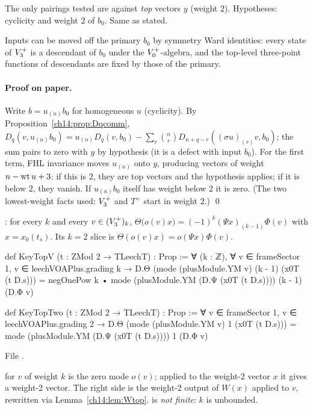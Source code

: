 \begin{dictionary}
The only pairings tested are against \emph{top} vectors $y$ (weight $2$).  Hypotheses: cyclicity and
weight $2$ of $b_0$.  Same as stated.
\end{dictionary}

\begin{physics}
Inputs can be moved off the primary $b_0$ by symmetry Ward identities: every state of $V_3^{+}$ is a
descendant of $b_0$ under the $V_0^{+}$-algebra, and the top-level three-point functions of
descendants are fixed by those of the primary.
\end{physics}

\paragraph{Proof on paper.}  Write $b=u_{(n)}b_0$ for homogeneous $u$ (cyclicity).  By
Proposition~\ref{ch14:prop:Dqcomm}, $D_q(v,u_{(n)}b_0)=u_{(n)}D_q(v,b_0)-\sum_r\binom nr D_{n+q-r}((\sigma u)_{(r)}v,b_0)$;
the sum pairs to zero with $y$ by hypothesis (it is a defect with input $b_0$).  For the first term,
FHL invariance moves $u_{(n)}$ onto $y$, producing vectors of weight $n-\operatorname{wt} u+3$: if this is $2$, they are
top vectors and the hypothesis applies; if it is below $2$, they vanish.  If $u_{(n)}b_0$ itself has weight
below $2$ it is zero.  (The two lowest-weight facts used: $V_3^{+}$ and $T^+$ start in weight $2$.) \qed

\begin{definition}\label{ch14:def:keytopv}
: for every $k$ and every $v\in(V_3^{+})_k$,
$\Theta\bigl(o(v)x\bigr)=(-1)^k(\Psi x)_{(k-1)}\Phi(v)$ with $x=x_0(t_s)$.  Its $k=2$ slice
 is $\Theta(o(v)x)=o(\Psi x)\Phi(v)$.
\end{definition}
\begin{leancode}
def KeyTopV (t : ZMod 2 → TLeechT) : Prop :=
  ∀ (k : ℤ), ∀ v ∈ frameSector 1, v ∈ leechVOAPlus.grading k →
    D.Θ (mode (plusModule.YM v) (k - 1) (x0T (t D.s)))
      = negOnePow k • mode (plusModule.YM (D.Ψ (x0T (t D.s)))) (k - 1) (D.Φ v)

def KeyTopTwo (t : ZMod 2 → TLeechT) : Prop :=
  ∀ v ∈ frameSector 1, v ∈ leechVOAPlus.grading 2 →
    D.Θ (mode (plusModule.YM v) 1 (x0T (t D.s)))
      = mode (plusModule.YM (D.Ψ (x0T (t D.s)))) 1 (D.Φ v)
\end{leancode}
File .

\begin{dictionary}
 for $v$ of weight $k$ is the zero mode $o(v)$; applied to the weight-2
vector $x$ it gives a weight-2 vector.  The right side is the weight-2 output of $W(x)$ applied to $v$,
rewritten via Lemma~\ref{ch14:lem:Wtop}.   is \emph{not finite}: $k$ is unbounded.
\end{dictionary}

